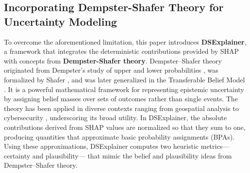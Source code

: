 \documentclass[acmlarge]{acmart}
\begin{document}
\subsection{Incorporating Dempster-Shafer Theory for Uncertainty Modeling}
To overcome the aforementioned limitation, this paper introduces \textbf{DSExplainer}, a framework that integrates the deterministic contributions provided by SHAP with concepts from \textbf{Dempster-Shafer theory}. Dempster--Shafer theory originated from Dempster's study of upper and lower probabilities \cite{dempster1967upper}, was formalized by Shafer \cite{shafer1976mathematical}, and was later generalized in the Transferable Belief Model \cite{smets1994transferable}. It is a powerful mathematical framework for representing epistemic uncertainty by assigning belief masses over sets of outcomes rather than single events. The theory has been applied in diverse contexts ranging from geospatial analysis \cite{park2011dempster} to cybersecurity \cite{tian2020deep}, underscoring its broad utility. In DSExplainer, the absolute contributions derived from SHAP values are normalized so that they sum to one, producing quantities that approximate basic probability assignments (BPAs). Using these approximations, DSExplainer computes two heuristic metrics—certainty and plausibility— that mimic the belief and plausibility ideas from Dempster--Shafer theory.
\end{document}
